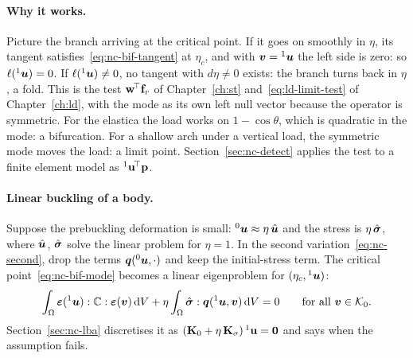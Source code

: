 \paragraph{Why it works.}
Picture the branch arriving at the critical point. If it goes on smoothly in $\eta$, its
tangent satisfies~\eqref{eq:nc-bif-tangent} at $\eta_c$, and with $\bm{v} = {}^1\bm{u}$ the left side is
zero: so $\ell({}^1\bm{u}) = 0$. If $\ell({}^1\bm{u}) \neq 0$, no tangent with $d\eta \neq 0$ exists:
the branch turns back in $\eta$, a fold. This is the test $\mathbf{w}^{\!\top}\mathbf{f}_r$ of
Chapter~\ref{ch:st} and~\eqref{eq:ld-limit-test} of Chapter~\ref{ch:ld}, with the mode as
its own left null vector because the operator is symmetric. For the elastica the load
works on $1 - \cos\theta$, which is quadratic in the mode: a bifurcation. For a shallow arch
under a vertical load, the symmetric mode moves the load: a limit point.
Section~\ref{sec:nc-detect} applies the test to a finite element model as
${}^1\mathbf{u}^{\!\top}\mathbf{p}$.

\paragraph{Linear buckling of a body.}
%
Suppose the prebuckling deformation is small: ${}^0\bm{u} \approx \eta\,\hat{\bm{u}}$ and the stress is
$\eta\,\hat{\bm{\sigma}}$, where $\hat{\bm{u}}$, $\hat{\bm{\sigma}}$ solve the linear problem for $\eta = 1$. In the
second variation~\eqref{eq:nc-second}, drop the terms $\bm{q}({}^0\bm{u},\cdot)$ and keep the
initial-stress term. The critical point~\eqref{eq:nc-bif-mode} becomes a linear eigenproblem
for $(\eta_c,{}^1\bm{u})$:
\begin{equation}\label{eq:nc-bif-lba}
  \int_\Omega \bm{\varepsilon}({}^1\bm{u}):\mathbb{C}:\bm{\varepsilon}(\bm{v})\,\mathrm{d} V
  + \eta\int_\Omega \hat{\bm{\sigma}}:\bm{q}({}^1\bm{u},\bm{v})\,\mathrm{d} V = 0
  \qquad\text{for all } \bm{v}\in\mathcal{K}_0 .
\end{equation}
Section~\ref{sec:nc-lba} discretises it as $(\mathbf{K}_0 + \eta\,\mathbf{K}_\sigma)\,{}^1\mathbf{u} = \mathbf{0}$ and
says when the assumption fails.

